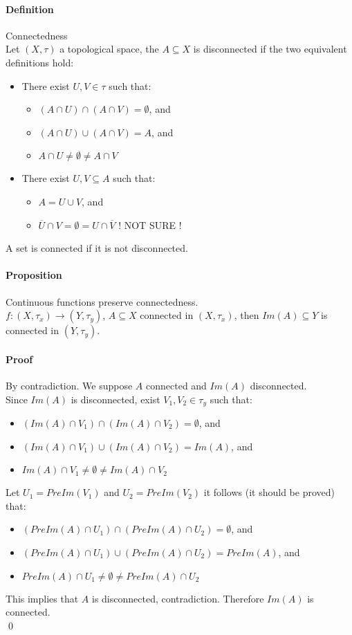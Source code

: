 \documentclass{article}
\newcommand{\func}[3]{#1 : #2 \rightarrow #3}
\newcommand{\Def}{\paragraph{Definition}}
\newcommand{\Proposition}{\paragraph{Proposition}}
\newcommand{\Proof}{\paragraph{Proof}}
\begin{document}
	\Def Connectedness
\\Let $(X, \tau)$ a topological space, the $A \subseteq X$ is disconnected if
	the two equivalent definitions hold:
	\begin{itemize}
		\item There exist $U, V \in \tau$ such that:
		\begin{itemize}
			\item $(A \cap U) \cap (A \cap V) = \emptyset$, and
			\item $(A \cap U) \cup (A \cap V) = A$, and
			\item $A \cap U \neq \emptyset \neq A \cap V$
		\end{itemize}

		\item There exist $U, V \subseteq A$ such that:
		\begin{itemize}
			\item $A = U \cup V$, and
			\item $\overline{U} \cap V = \emptyset = U \cap \overline{V}$ ! NOT SURE !
		\end{itemize}
	\end{itemize}
	A set is connected if it is not disconnected.

	\Proposition Continuous functions preserve connectedness.
\\$\func{f}{(X,\tau_x)}{(Y,\tau_y)}$, $A \subseteq X$ connected in $(X,\tau_x)$,
	then $Im(A) \subseteq Y$ is connected in $(Y,\tau_y)$.

	\Proof By contradiction. We suppose $A$ connected and $Im(A)$ disconnected.
\\Since $Im(A)$ is disconnected, exist $V_1, V_2 \in \tau_y$ such that:
	\begin{itemize}
		\item $(Im(A) \cap V_1) \cap (Im(A) \cap V_2) = \emptyset$, and
		\item $(Im(A) \cap V_1) \cup (Im(A) \cap V_2) = Im(A)$, and
		\item $Im(A) \cap V_1 \neq \emptyset \neq Im(A) \cap V_2$
	\end{itemize}
	Let $U_1 = PreIm(V_1)$ and $U_2 = PreIm(V_2)$ it follows (it should be proved)
	that:
	\begin{itemize}
		\item $(PreIm(A) \cap U_1) \cap (PreIm(A) \cap U_2) = \emptyset$, and
		\item $(PreIm(A) \cap U_1) \cup (PreIm(A) \cap U_2) = PreIm(A)$, and
		\item $PreIm(A) \cap U_1 \neq \emptyset \neq PreIm(A) \cap U_2$
	\end{itemize}
	This implies that $A$ is disconnected, contradiction. Therefore $Im(A)$ is
	connected.
\\\qed
\end{document}
